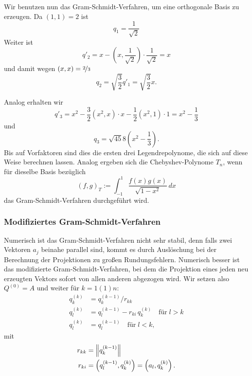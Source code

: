 Wir benutzen nun das Gram-Schmidt-Verfahren, um eine orthogonale Basis
zu erzeugen. Da  $(1, 1) = 2$ ist
\begin{equation}
  q_1 = \frac{1}{\sqrt{2}}
\end{equation}
Weiter ist
\begin{equation}
  q'_2 = x - \left(x, \frac{1}{\sqrt{2}}\right) \cdot \frac{1}{\sqrt{2}} = 
  x
\end{equation}
und damit wegen $(x,x) = \nicefrac{2}{3}$
\begin{equation}
  q_2 = \sqrt{\frac{3}{2}} q'_1 =
  \sqrt{\frac{3}{2}} x.
\end{equation}

Analog erhalten wir
\begin{equation}
  q'_3 = x^2 - \frac{3}{2} (x^2, x) \cdot x - \frac{1}{2}(x^2, 1) \cdot 1 = 
  x^2  - \frac{1}{3}
\end{equation}
und
\begin{equation}
  q_3 = \sqrt{45}{8}\left(x^2  - \frac{1}{3}\right).
\end{equation}
Bis auf Vorfaktoren sind dies die ersten drei Legendrepolynome, die
sich auf diese Weise berechnen lassen. Analog ergeben sich die
Chebyshev-Polynome $T_n$, wenn für dieselbe Basis bezüglich
\begin{equation}
  (f, g)_T := \int_{-1}^1 \frac{f(x)g(x)}{\sqrt{1-x^2}}\, dx
\end{equation}
das Gram-Schmidt-Verfahren durchgeführt wird.

\subsubsection{Modifiziertes Gram-Schmidt-Verfahren}

Numerisch ist das Gram-Schmidt-Verfahren nicht sehr stabil, denn falls
zwei Vektoren $a_j$ beinahe parallel sind, kommt es durch Auslöschung
bei der Berechnung der Projektionen zu großen
Rundungsfehlern. Numerisch besser ist das modifizierte
Gram-Schmidt-Verfahren, bei dem die Projektion eines jeden neu
erzeugten Vektors sofort von allen anderen abgezogen wird. Wir setzen
also $Q^{(0)}=A$ und weiter für $k=1(1)n$:
\begin{align}
  \label{eq:modgs}
  q_k^{(k)} &= q_k^{(k-1)}/r_{kk}\nonumber\\
  q_l^{(k)} &= q_l^{(k-1)} - r_{ki}\,q_k^{(k)}\quad\text{für}\; l>k\\
  q_l^{(k)} &= q_l^{(k-1)} \quad\text{für}\; l<k,\nonumber
\end{align}
mit
\begin{align}
  r_{kk} &= \left\lVert{q_k^{(k-1)}}\right\rVert\nonumber\\
  r_{ki} &= \left(q_l^{(k-1)}, q_k^{(k)}\right) =  \left(a_l, q_k^{(k)}\right).
\end{align}

